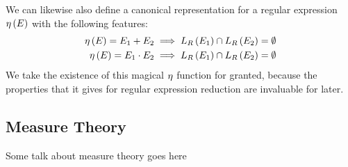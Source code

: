 We can likewise also define a canonical representation for a
regular expression \(\eta\left(E\right)\) with the following features:
\begin{align*}
  \eta\left(E\right) = E_1 + E_2
    &\implies L_{R}\left(E_1\right) \cap L_{R}\left(E_2\right) = \emptyset \\
  \eta\left(E\right) = E_1 \cdot E_2
    &\implies L_{R}\left(E_1\right) \cap L_{R}\left(E_2\right) = \emptyset
\end{align*}
We take the existence of this magical \(\eta\) function for granted,
because the properties that it gives for regular expression
reduction are invaluable for later.

\subsection{Measure Theory}
Some talk about measure theory goes here


